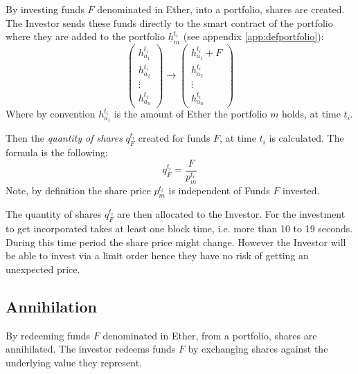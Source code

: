 \documentclass[9pt,oneside]{amsart}
\theoremstyle{plain}
\begin{document}
\begin{multicols}{2}
    By investing funds $F$ denominated in Ether, into a portfolio, shares are created. The Investor sends these funds directly to the smart contract of the portfolio where they are added to the portfolio $\underline{h}_m^{t_i}$ (see appendix \ref{app:defportfolio}):
    \begin{equation*}
        \begin{pmatrix}
            h_{a_{1}}^{t_i}\\
            h_{a_{2}}^{t_i}\\
            \vdots \\
            h_{a_{n}}^{t_i}
        \end{pmatrix}
        \rightarrow
        \begin{pmatrix}
            h_{a_{1}}^{t_i} + F\\
            h_{a_{2}}^{t_i}\\
            \vdots \\
            h_{a_{n}}^{t_i}
        \end{pmatrix}
    \end{equation*}
    Where by convention $h_{a_{1}}^{t_i}$ is the amount of Ether the portfolio $m$ holds, at time $t_i$.
    
    Then the \textit{quantity of shares} $q_{F}^{t_i}$ created for funds $F$, at time $t_i$ is calculated. The formula is the following:
    \begin{equation}
        q_{F}^{t_i} = \frac{F}{p_{m}^{t_i}}
    \end{equation}
    Note, by definition the share price $p_{m}^{t_i}$ is independent of Funds $F$ invested.
    
    The quantity of shares $q_{F}^{t_i}$ are then allocated to the Investor. For the investment to get incorporated takes at least one block time, i.e. more than 10 to 19 seconds. During this time period the share price might change. However the Investor will be able to invest via a limit order hence they have no risk of getting an unexpected price.
    
    \subsection{Annihilation}\label{sub:annihilation}
    
    By redeeming funds $F$ denominated in Ether, from a portfolio, shares are annihilated. The investor redeems funds $F$ by exchanging shares against the underlying value they represent.
    

\end{multicols}
\end{document}

